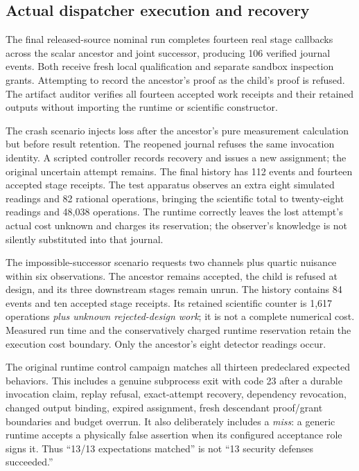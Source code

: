 \documentclass[11pt]{article}
\begin{document}
\subsection{Actual dispatcher execution and recovery}

The final released-source nominal run completes fourteen real stage callbacks across the scalar ancestor and joint successor, producing 106 verified journal events. Both receive fresh local qualification and separate sandbox inspection grants. Attempting to record the ancestor's proof as the child's proof is refused. The artifact auditor verifies all fourteen accepted work receipts and their retained outputs without importing the runtime or scientific constructor.

The crash scenario injects loss after the ancestor's pure measurement calculation but before result retention. The reopened journal refuses the same invocation identity. A scripted controller records recovery and issues a new assignment; the original uncertain attempt remains. The final history has 112 events and fourteen accepted stage receipts. The test apparatus observes an extra eight simulated readings and 82 rational operations, bringing the scientific total to twenty-eight readings and 48,038 operations. The runtime correctly leaves the lost attempt's actual cost unknown and charges its reservation; the observer's knowledge is not silently substituted into that journal.

The impossible-successor scenario requests two channels plus quartic nuisance within six observations. The ancestor remains accepted, the child is refused at design, and its three downstream stages remain unrun. The history contains 84 events and ten accepted stage receipts. Its retained scientific counter is 1,617 operations \emph{plus unknown rejected-design work}; it is not a complete numerical cost. Measured run time and the conservatively charged runtime reservation retain the execution cost boundary. Only the ancestor's eight detector readings occur.

The original runtime control campaign matches all thirteen predeclared expected behaviors. This includes a genuine subprocess exit with code 23 after a durable invocation claim, replay refusal, exact-attempt recovery, dependency revocation, changed output binding, expired assignment, fresh descendant proof/grant boundaries and budget overrun. It also deliberately includes a \emph{miss}: a generic runtime accepts a physically false assertion when its configured acceptance role signs it. Thus ``13/13 expectations matched'' is not ``13 security defenses succeeded.''
\end{document}
